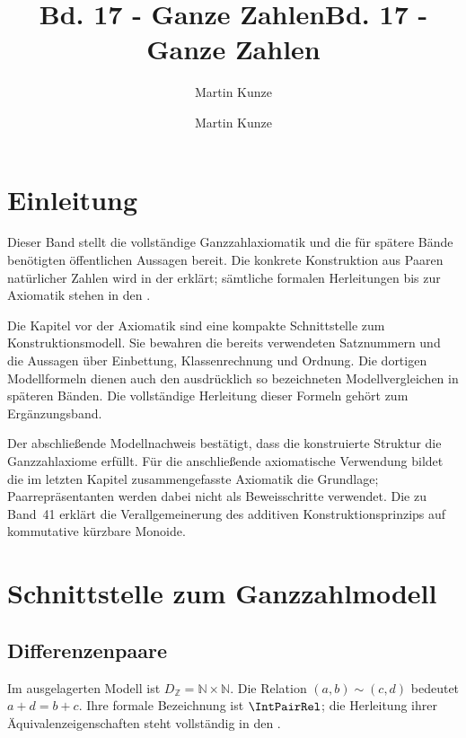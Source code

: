 \documentclass[main.tex]{subfiles}
\title{Bd. 17 - Ganze Zahlen}
\author{Martin Kunze}
\date{}
\begin{document}
\title{Bd. 17 - Ganze Zahlen}
\author{Martin Kunze}
\date{}
\hypersetup{pageanchor=false}
\maketitle
\hypersetup{pageanchor=true}
\setcounter{tocdepth}{3}
\tableofcontents
\setcounter{file}{17}
\renewcommand{\FormulaBandID}{17}

\chapter{Einleitung}

Dieser Band stellt die vollständige Ganzzahlaxiomatik und die für spätere
Bände benötigten öffentlichen Aussagen bereit. Die konkrete Konstruktion
aus Paaren natürlicher Zahlen wird in der \IntegersReadingLink{}
erklärt; sämtliche formalen Herleitungen bis zur Axiomatik stehen in den
\IntegersProofsLink{}.

Die Kapitel vor der Axiomatik sind eine kompakte Schnittstelle zum
Konstruktionsmodell. Sie bewahren die bereits verwendeten Satznummern
und die Aussagen über Einbettung, Klassenrechnung und Ordnung.
Die dortigen Modellformeln dienen auch den ausdrücklich so bezeichneten
Modellvergleichen in späteren Bänden. Die vollständige Herleitung
dieser Formeln gehört zum Ergänzungsband.

Der abschließende Modellnachweis bestätigt, dass die konstruierte Struktur
die Ganzzahlaxiome erfüllt. Für die anschließende axiomatische Verwendung
bildet die im letzten Kapitel zusammengefasste Axiomatik die Grundlage;
Paarrepräsentanten werden dabei nicht als Beweisschritte verwendet.
Die \DifferencesReadingLink{} zu Band~41 erklärt die Verallgemeinerung
des additiven Konstruktionsprinzips auf kommutative kürzbare Monoide.

\chapter{Schnittstelle zum Ganzzahlmodell}

\section{Differenzenpaare}
Im ausgelagerten Modell ist \(D_{\mathbb Z}=\mathbb N\times\mathbb N\).
Die Relation \((a,b)\sim(c,d)\) bedeutet \(a+d=b+c\).
Ihre formale Bezeichnung ist \(\IntPairRel\); die Herleitung ihrer
Äquivalenzeigenschaften steht vollständig in den \IntegersProofsLink{}.
\end{document}
